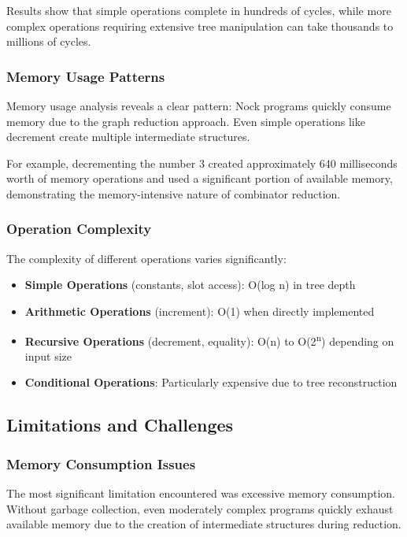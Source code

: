 \documentclass[twoside]{article}
\begin{document}
\noindent
Results show that simple operations complete in hundreds of cycles, while more complex operations requiring extensive tree manipulation can take thousands to millions of cycles.

\subsubsection{Memory Usage Patterns}

Memory usage analysis reveals a clear pattern: Nock programs quickly consume memory due to the graph reduction approach. Even simple operations like decrement create multiple intermediate structures.

For example, decrementing the number 3 created approximately 640 milliseconds worth of memory operations and used a significant portion of available memory, demonstrating the memory-intensive nature of combinator reduction.

\subsubsection{Operation Complexity}

The complexity of different operations varies significantly:

\begin{itemize}
  \item \textbf{Simple Operations} (constants, slot access): O(log n) in tree depth
  \item \textbf{Arithmetic Operations} (increment): O(1) when directly implemented
  \item \textbf{Recursive Operations} (decrement, equality): O(n) to O(2\textsuperscript{n}) depending on input size
  \item \textbf{Conditional Operations}: Particularly expensive due to tree reconstruction
\end{itemize}

\subsection{Limitations and Challenges}

\subsubsection{Memory Consumption Issues}

The most significant limitation encountered was excessive memory consumption. Without garbage collection, even moderately complex programs quickly exhaust available memory due to the creation of intermediate structures during reduction.
\end{document}
